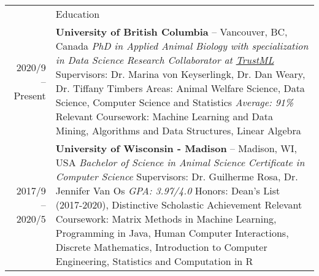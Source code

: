 \documentclass[letterpaper, 11pt]{article}
\newcommand{\headingfont}{\Large\color{OliveGreen}}
\newenvironment{SectionTable}[1]{
	\renewcommand*{\arraystretch}{1.7}
	\setlength{\tabcolsep}{10pt}
	\begin{longtable}{Rp{5.2in}} & #1 \\}
{\end{longtable}\vspace{-.3cm}}
\begin{document}
\begin{SectionTable}{\headingfont Education}
2020/9 -- Present & 
\textbf{University of British Columbia} -- Vancouver, BC, Canada \newline
\textit{PhD in Applied Animal Biology with specialization in Data Science} \newline 
\textit{Research Collaborator at \href{https://trustml.ubc.ca/profiles/sky-sheng}{TrustML}} \newline 
Supervisors: Dr. Marina von Keyserlingk, Dr. Dan Weary, Dr. Tiffany Timbers \newline
Areas: Animal Welfare Science, Data Science, Computer Science and Statistics \newline
\textit{Average: 91\%} \newline
Relevant Coursework: Machine Learning and Data Mining, Algorithms and Data Structures, Linear Algebra \\

2017/9 -- 2020/5 & 
\textbf{University of Wisconsin - Madison} -- Madison, WI, USA \newline
\textit{Bachelor of Science in Animal Science} \newline 
\textit{Certificate in Computer Science} \newline 
Supervisors: Dr. Guilherme Rosa, Dr. Jennifer Van Os \newline
\textit{GPA: 3.97/4.0} \newline
Honors: Dean's List (2017-2020), Distinctive Scholastic Achievement \newline
Relevant Coursework: Matrix Methods in Machine Learning, Programming in Java, Human Computer Interactions, Discrete Mathematics, Introduction to Computer Engineering, Statistics and Computation in R \\
\end{SectionTable}
\end{document}
